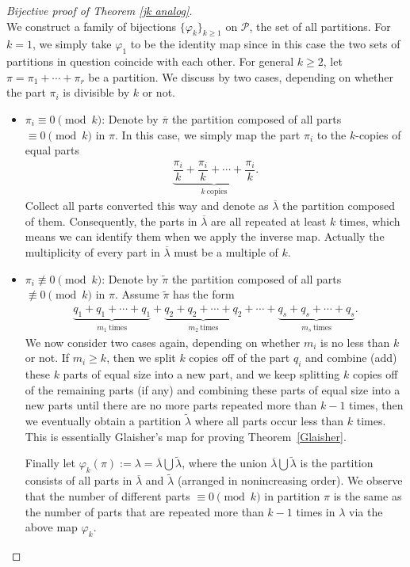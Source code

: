 \documentclass[12pt]{amsart}
\numberwithin{equation}{section}
\theoremstyle{plain}
\theoremstyle{definition}
\begin{document}
\begin{proof}[Bijective proof of Theorem \ref{jk analog}]\ \\
We construct a family of bijections $\{\varphi_{k}\}_{k\geq 1}$ on $\mathcal{P}$, the set of all partitions. For $k=1$, we simply take $\varphi_1$ to be the identity map since in this case the two sets of partitions in question coincide with each other. For general $k\geq 2$, let $\pi=\pi_{1}+\cdots+\pi_{r}$ be a partition. We discuss by two cases, depending on whether the part $\pi_{i}$ is divisible by $k$ or not.
\begin{itemize}
\item $\pi_{i}\equiv0\pmod{k}$: Denote by $\overline{\pi}$ the partition composed of all parts $\equiv0\pmod{k}$ in $\pi$. In this case, we simply map the part $\pi_{i}$ to the $k$-copies of equal parts
\begin{align*}
\underbrace{\dfrac{\pi_{i}}{k}+\dfrac{\pi_{i}}{k}+\cdots+\dfrac{\pi_{i}}{k}}_{k~\textrm{copies}}.
\end{align*}
Collect all parts converted this way and denote as $\overline{\lambda}$ the partition composed of them. Consequently, the parts in $\overline{\lambda}$ are all repeated at least $k$ times, which means we can identify them when we apply the inverse map. Actually the multiplicity of every part in $\overline{\lambda}$ must be a multiple of $k$.

\item $\pi_{i}\not\equiv0\pmod{k}$: Denote by $\tilde{\pi}$ the partition composed of all parts $\not\equiv0\pmod{k}$ in $\pi$. Assume $\widetilde{\pi}$ has the form
\begin{align*}
\underbrace{q_{1}+q_{1}+\cdots+q_{1}}_{m_{1}~\textrm{times}}+\underbrace{q_{2}+q_{2}+\cdots+q_{2}}_{m_{2}~\textrm{times}}+\cdots+\underbrace{q_{s}+q_{s}+\cdots+q_{s}}_
{m_{s}~\textrm{times}}.
\end{align*}
We now consider two cases again, depending on whether $m_{i}$ is no less than $k$ or not. If $m_{i}\geq k$, then we split $k$ copies off of the part $q_{i}$ and combine (add) these $k$ parts of equal size into a new part, and we keep splitting $k$ copies off of the remaining parts (if any) and combining these parts of equal size into a new parts until there are no more parts repeated more than $k-1$ times, then we eventually obtain a partition $\widetilde{\lambda}$ where all parts occur less than $k$ times. This is essentially Glaisher's map for proving Theorem~\ref{Glaisher}.

Finally let $\varphi_k(\pi):=\lambda=\overline{\lambda}\bigcup\widetilde{\lambda}$, where the union $\overline{\lambda}\bigcup\widetilde{\lambda}$ is the partition consists of all parts in $\overline{\lambda}$ and $\widetilde{\lambda}$ (arranged in nonincreasing order). We observe that the number of different parts $\equiv0\pmod{k}$ in partition $\pi$ is the same as the number of parts that are repeated more than $k-1$ times in $\lambda$ via the above map $\varphi_k$.
\end{itemize}


\end{proof}
\end{document}
